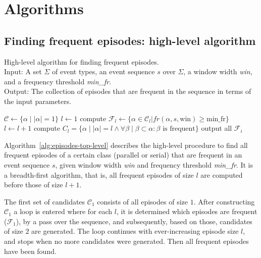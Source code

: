 \section{Algorithms}

\subsection{Finding frequent episodes: high-level algorithm}

\begin{algorithm}

\caption{High-level algorithm for finding frequent episodes. \\
Input: A set $ \Sigma $ of event types, an event sequence $ s $ over $ \Sigma $, a window width \emph{win}, and a frequency threshold \emph{min\_fr}. \\
Output: The collection of episodes that are frequent in the sequence in terms of the input parameters.
}

\begin{algorithmic}[1]

\State $ \mathcal{C} \gets \{ \alpha \mid | \alpha | = 1 \} $
\State $ l \gets 1 $
    \State compute $ \mathcal{F}_l \gets \{ \alpha \in \mathcal{C}_l | fr(\alpha, s, \text{win}) \geq \text{min\_fr} \} $
    \State $ l \gets l + 1 $
    \State compute $ C_l = \{ \alpha \mid | \alpha | = l \wedge \forall \beta \mid \beta \subset \alpha : \beta \text{ is frequent} \} $
\EndWhile
\State output all $ \mathcal{F}_i $

\end{algorithmic}

\label{alg:episodes-top-level}
\end{algorithm}


Algorithm~\ref{alg:episodes-top-level} describes the high-level procedure to find all frequent episodes of a certain class (parallel or serial) that are frequent in an event sequence $ s $, given window width \emph{win} and frequency threshold \emph{min\_fr}. It is a breadth-first algorithm, that is, all frequent episodes of size $ l $ are computed before those of size $ l + 1 $.

The first set of candidates $ \mathcal{C}_1 $ consists of all episodes of size $ 1 $. After constructing $ \mathcal{C}_1 $ a loop is entered where for each $ l $, it is determined which episodes are frequent ($ \mathcal{F}_1 $), by a pass over the sequence, and subsequently, based on those, candidates of size $ 2 $ are generated. The loop continues with ever-increasing episode size $ l $, and stops when no more candidates were generated. Then all frequent episodes have been found.

